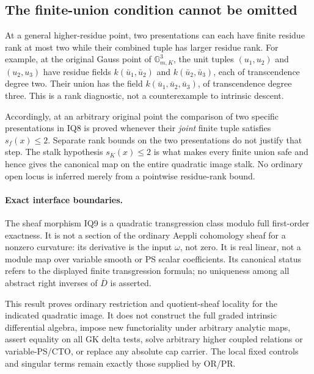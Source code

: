 \subsection{The finite-union condition cannot be omitted}

At a general higher-residue point, two presentations can each
have finite residue rank at most two while their combined tuple
has larger residue rank.  For example, at the original Gauss
point of \(\mathbb G_{m,K}^3\), the unit tuples
\((u_1,u_2)\) and \((u_2,u_3)\) have residue fields
\(k(\bar u_1,\bar u_2)\) and \(k(\bar u_2,\bar u_3)\),
each of transcendence degree two.  Their union has the field
\(k(\bar u_1,\bar u_2,\bar u_3)\), of transcendence degree
three.  This is a rank diagnostic, not a counterexample to
intrinsic descent.

Accordingly, at an arbitrary original point the comparison of
two specific presentations in IQ8 is proved whenever their
\emph{joint} finite tuple satisfies \(s_f(x)\le2\).  Separate
rank bounds on the two presentations do not justify that step.
The stalk hypothesis \(s_K(x)\le2\) is what makes every finite
union safe and hence gives the canonical map on the entire
quadratic image stalk.  No ordinary open locus is inferred merely
from a pointwise residue-rank bound.

\paragraph{Exact interface boundaries.}
The sheaf morphism IQ9 is a quadratic transgression class modulo
full first-order exactness.  It is not a section of the ordinary
Aeppli cohomology sheaf for a nonzero curvature: its derivative
is the input \(\omega\), not zero.  It is real linear, not a
module map over variable smooth or PS scalar coefficients.  Its
canonical status refers to the displayed finite transgression
formula; no uniqueness among all abstract right inverses of
\(\overline D\) is asserted.

This result proves ordinary restriction and quotient-sheaf locality
for the indicated quadratic image.  It does not construct the full
graded intrinsic differential algebra, impose new functoriality
under arbitrary analytic maps, assert equality on all GK delta
tests, solve arbitrary higher coupled relations or variable-PS/CTO,
or replace any absolute cap carrier.  The local fixed controls
and singular terms remain exactly those supplied by OR/PR.

